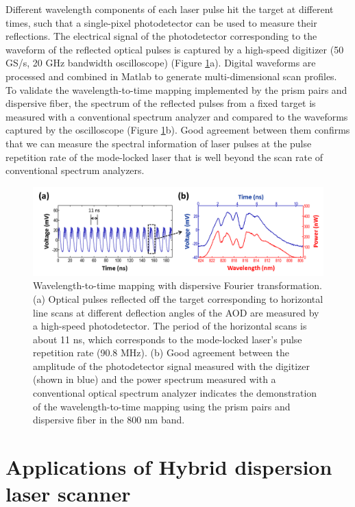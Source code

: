 Different wavelength components of each laser pulse hit the target at different times, such that a single-pixel photodetector can be used to measure their reflections. The electrical signal of the photodetector corresponding to the waveform of the reflected optical pulses is captured by a high-speed digitizer (50 GS/s, 20 GHz bandwidth oscilloscope) (Figure \ref{fig:PW2013_Figure3}a). Digital waveforms are processed and combined in Matlab to generate multi-dimensional scan profiles. To validate the wavelength-to-time mapping implemented by the prism pairs and dispersive fiber, the spectrum of the reflected pulses from a fixed target is measured with a conventional spectrum analyzer and compared to the waveforms captured by the oscilloscope (Figure \ref{fig:PW2013_Figure3}b). Good agreement between them confirms that we can measure the spectral information of laser pulses at the pulse repetition rate of the mode-locked laser that is well beyond the scan rate of conventional spectrum analyzers.

\begin{figure}[htb!]
\centering
\includegraphics[scale=0.65]{PW2013/Figure3.png}
\caption{Wavelength-to-time mapping with dispersive Fourier transformation. (a) Optical pulses reflected off the target corresponding to horizontal line scans at different deflection angles of the AOD are measured by a high-speed photodetector. The period of the horizontal scans is about 11 ns, which corresponds to the mode-locked laser's pulse repetition rate (90.8 MHz). (b) Good agreement between the amplitude of the photodetector signal measured with the digitizer (shown in blue) and the power spectrum measured with a conventional optical spectrum analyzer indicates the demonstration of the wavelength-to-time mapping using the prism pairs and dispersive fiber in the 800 nm band.}
\label{fig:PW2013_Figure3}
\end{figure}

\section{Applications of Hybrid dispersion laser scanner}

